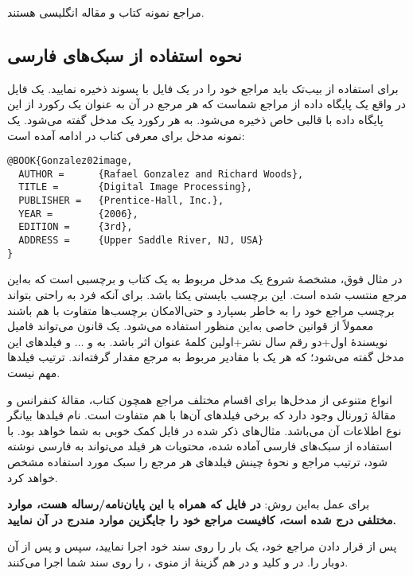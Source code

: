 مراجع 
\cite{Gonzalez02book,Baker02limits} 
نمونه کتاب و مقاله انگلیسی هستند.


\subsection{ نحوه استفاده از سبک‌های فارسی}


برای استفاده از بیب‌تک باید مراجع خود را در یک فایل با پسوند  ذخیره نمایید. یک فایل  در واقع یک پایگاه داده از مراجع  شماست که هر مرجع در آن به عنوان یک رکورد از این پایگاه داده
با قالبی خاص ذخیره می‌شود. به هر رکورد یک مدخل گفته می‌شود. یک نمونه مدخل برای معرفی کتاب  در ادامه آمده است:

\begin{latin}
\begin{Verbatim}
@BOOK{Gonzalez02image,
  AUTHOR =      {Rafael Gonzalez and Richard Woods},
  TITLE =       {Digital Image Processing},
  PUBLISHER =   {Prentice-Hall, Inc.},
  YEAR =        {2006},
  EDITION =     {3rd},
  ADDRESS =     {Upper Saddle River, NJ, USA}
}
\end{Verbatim}
\end{latin}

در مثال فوق،  مشخصهٔ شروع یک مدخل مربوط به یک کتاب و  برچسبی است که به‌این مرجع منتسب شده است.
 این برچسب بایستی یکتا باشد. برای آنکه فرد به راحتی بتواند برچسب مراجع خود را به خاطر بسپارد و حتی‌الامکان برچسب‌ها متفاوت با هم باشند معمولاً از قوانین خاصی به‌این منظور استفاده می‌شود. یک قانون می‌تواند فامیل نویسندهٔ اول+دو رقم سال نشر+اولین کلمهٔ عنوان اثر باشد. به  و $\dots$ و  فیلدهای این مدخل گفته می‌شود؛ که هر یک با مقادیر مربوط به مرجع مقدار گرفته‌اند. ترتیب فیلدها مهم نیست. 

انواع متنوعی از مدخل‌ها برای اقسام مختلف مراجع همچون کتاب، مقالهٔ کنفرانس و مقالهٔ ژورنال وجود دارد که برخی فیلدهای آن‌ها با هم متفاوت است. 
نام فیلدها بیانگر نوع اطلاعات آن می‌باشد. مثال‌های ذکر شده در فایل  کمک خوبی به شما خواهد بود. 
با استفاده از سبک‌های فارسی آماده شده، محتویات هر فیلد می‌تواند به فارسی نوشته شود، ترتیب مراجع و نحوهٔ چینش فیلدهای هر مرجع را سبک مورد استفاده  مشخص خواهد کرد.

برای عمل به‌این روش: 
\textbf{در فایل 
 که همراه با این پایان‌نامه/رساله هست، موارد مختلفی درج شده است، کافیست مراجع خود را جایگزین موارد مندرج در آن نمایید.}

پس از قرار دادن مراجع خود، یک بار  را روی سند خود اجرا نمایید، سپس  و پس از آن دوبار  را. 
در 
 و
 کلید  و در  هم گزینهٔ  از منوی ،  را روی سند شما اجرا می‌کنند.

